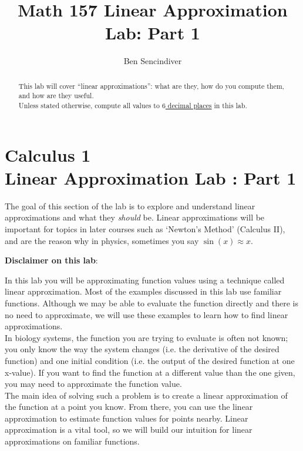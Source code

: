 \documentclass[handout,nooutcomes]{ximera}
\title{Math 157 Linear Approximation Lab: Part 1}
\author{Ben Sencindiver} %
\begin{document}
\section{Calculus 1\\ Linear Approximation Lab : Part 1}

\begin{abstract}
This lab will cover ``linear approximations'': what are they,
how do you compute them, and how are they useful. \\

Unless stated otherwise, compute all values to \underline{$6$ decimal places} in this lab.
\end{abstract}



\maketitle



The goal of this section of the lab is to explore and understand linear
approximations and what they {\it should} be. Linear approximations will
be important for topics in later courses such as `Newton's Method' (Calculus II),
and are the reason why in physics, sometimes you say $\sin(x)\approx x$.

\textbf{Disclaimer on this lab}:

In this lab you will be approximating function values using a technique
called linear approximation.  Most of the examples discussed in this
lab use familiar functions.  Although we may be able to evaluate the function
directly and there is no need to approximate, we will use these examples
to learn how to find linear approximations.\\


In biology systems, the function you are trying to evaluate is often
not known; you only know the way the system changes (i.e. the derivative
of the desired function) and one initial condition (i.e. the output of the
desired function at one x-value). If you want to find the function at a different
value than the one given, you may need to approximate the function value.\\

The main idea of solving such a problem is to create a linear approximation
of the function at a point you know.  From there, you can use the linear
approximation to estimate function values for points nearby. Linear
approximation is a vital tool, so we will build our intuition for
linear approximations on familiar functions. \\
\end{document}
